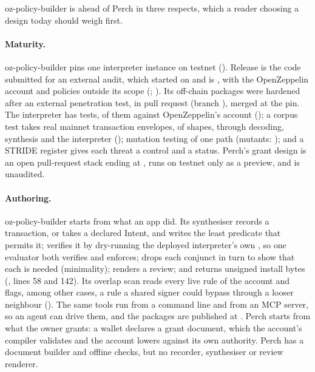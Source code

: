 oz-policy-builder is ahead of Perch in three respects, which a reader choosing a
design today should weigh first.

\paragraph{Maturity.} oz-policy-builder pins one interpreter instance on testnet
(). Release  is
the code submitted for an external audit, which started on
 and is , with the OpenZeppelin
account and policies outside its scope (;
). Its off-chain packages were hardened after
an external penetration test, in pull request  (branch
), merged at the pin. The interpreter has
 tests,  of them against
OpenZeppelin's  account (); a
corpus test takes  real mainnet transaction envelopes, of
 shapes, through decoding, synthesis and the interpreter
(); mutation testing of one
path (mutants: ); and a STRIDE register gives each threat a
control and a status. Perch's grant design is an open pull-request stack ending at
, runs on testnet only as a preview, and is unaudited.

\paragraph{Authoring.} oz-policy-builder starts from what an app did. Its
synthesiser records a transaction, or takes a declared Intent, and writes the
least predicate that permits it; verifies it by dry-running the deployed
interpreter's own , so one evaluator both verifies and enforces;
drops each conjunct in turn to show that each is needed (minimality); renders a
review; and returns unsigned install bytes
(, lines 58 and 142). Its overlap scan reads every
live rule of the account and flags, among other cases, a rule a shared signer
could bypass through a looser neighbour ().
The same  tools run from a command line and from an MCP
server, so an agent can drive them, and the packages are published at
. Perch starts from what the owner grants: a wallet
declares a grant document, which the account's compiler validates and the
account lowers against its own authority. Perch has a document builder and
offline checks, but no recorder, synthesiser or review renderer.

